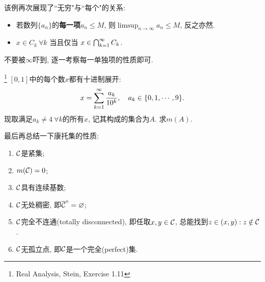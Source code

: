 \begin{remark}
    该例再次展现了``无穷"与``每个"的关系:
    \begin{itemize}
    \item 若数列$\{a_n\}$的\textbf{每一项}$a_n \leq M$, 则$\limsup_{n \to \infty}a_n \leq M$, 反之亦然. 
    \item $x \in C_k~\forall k$ 当且仅当 $x \in \bigcap_{k=1}^{\infty}C_k$.
    \end{itemize}
    不要被$\infty$吓到, 逐一考察每一单独项的性质即可. 
\end{remark}
\begin{exercise}\footnote{Real Analysis, Stein, Exercise 1.11}
    $[0, 1]$中的每个数$x$都有十进制展开:
    $$ x = \sum_{k=1}^{\infty}\frac{a_k}{10^k}, \quad a_k \in \{0, 1, \cdots, 9\}. $$
    现取满足$a_k \neq 4~\forall k$的所有$x$, 记其构成的集合为$A$. 求$m(A)$. 
\end{exercise}


最后再总结一下康托集的性质:
\begin{property}
    \begin{enumerate}
    \item $\mathcal{C}$是紧集;
    \item $m(\mathcal{C})=0$;
    \item $\mathcal{C}$具有连续基数;
    \item $\mathcal{C}$无处稠密, 即$\overline{\mathcal{C}}^\circ=\varnothing$;
    \item $\mathcal{C}$完全不连通(totally disconnected), 即任取$x,y \in \mathcal{C}$, 总能找到$z \in (x,y): z \notin \mathcal{C}$. 
    \item $\mathcal{C}$无孤立点, 即$\mathcal{C}$是一个完全(perfect)集.
    \end{enumerate}
\end{property}
